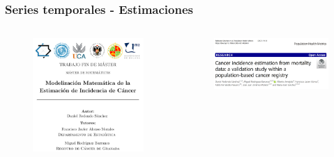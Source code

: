 \documentclass{beamer}
\begin{document}

\begin{frame}\frametitle{Series temporales - Estimaciones}
	\begin{columns}
		\begin{column}{0.4\textwidth}
			\begin{figure}
				\centering
				\includegraphics[width=\textwidth]{images/tfm_matematicas.png}
			\end{figure}
		\end{column}
		\begin{column}{0.6\textwidth}
			\begin{figure}
				\centering
				\includegraphics[width=\textwidth]{images/tfm_matematicas2.png}
			\end{figure}
		\end{column}
	\end{columns}
\end{frame}
\end{document}

